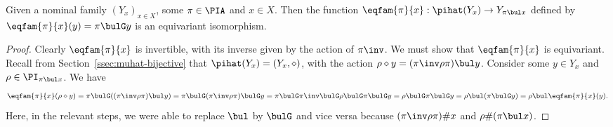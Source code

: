 \documentclass[twoside,11pt]{entics}
\begin{document}
\begin{xprop}\label{PiEquivIsoLem}
  Given a nominal family $(Y_x)_{x\in X}$, some $\pi\in\PIA$ and
  $x\in X$. Then the function $\eqfam{\pi}{x} : \pihat(Y_x)\to
  Y_{\pi\bul x}$ defined by $\eqfam{\pi}{x}(y) = \pi\bulG y$ is an
  equivariant isomorphism.
\end{xprop}

\begin{proof}
  Clearly $\eqfam{\pi}{x}$ is invertible, with its inverse given by
  the action of $\pi\inv$. We must show that $\eqfam{\pi}{x}$ is
  equivariant. Recall from Section~\ref{ssec:muhat-bijective} that
  $\pihat(Y_x)=(Y_x,\diamond)$, with the action $\rho\diamond y =
  (\pi\inv\rho\pi)\bul y$.  Consider some $y\in Y_x$ and
  $\rho\in\PI_{\pi\bul x}$. We have
  \[
  \eqfam{\pi}{x}(\rho\diamond y)
  = \pi\bulG((\pi\inv\rho\pi)\bul y)
  = \pi\bulG(\pi\inv\rho\pi)\bulG y
  = \pi\bulG\pi\inv\bulG\rho\bulG\pi\bulG y
  = \rho\bulG\pi\bulG y
  = \rho\bul(\pi\bulG y)
  = \rho\bul \eqfam{\pi}{x}(y).
  \]
  Here, in the relevant steps, we were able to replace $\bul$ by
  $\bulG$ and vice versa because $(\pi\inv\rho\pi)\# x$ and
  $\rho\#(\pi\bul x)$.
\end{proof}
\end{document}
